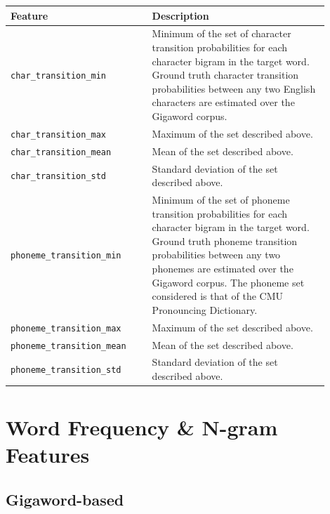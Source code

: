 \documentclass{dcthesis}
\theoremstyle{definition}
\theoremstyle{remark}
\begin{document}
\begin{table}[H]
  \centering
  \begin{tabular}{>{\centering\arraybackslash}p{0.4\linewidth}>{\arraybackslash}p{0.5\linewidth}}
    \hline \textbf{Feature} & \textbf{Description} \\ \hline
    \texttt{char\_transition\_min} & Minimum of the set of character transition probabilities for each character bigram in the target word. Ground truth character transition probabilities between any two English characters are estimated over the Gigaword corpus.\\
    \hline 
    \texttt{char\_transition\_max} & Maximum of the set described above.\\
    \hline 
    \texttt{char\_transition\_mean} & Mean of the set described above.\\
    \hline 
    \texttt{char\_transition\_std} & Standard deviation of the set described above.\\
    \hline 
    \texttt{phoneme\_transition\_min} & Minimum of the set of phoneme transition probabilities for each character bigram in the target word. Ground truth phoneme transition probabilities between any two phonemes are estimated over the Gigaword corpus. The phoneme set considered is that of the CMU Pronouncing Dictionary.\tablefootnote{\url{http://speech.cs.cmu.edu/cgi-bin/cmudict}}\\
    \hline 
    \texttt{phoneme\_transition\_max} & Maximum of the set described above.\\
    \hline 
    \texttt{phoneme\_transition\_mean} & Mean of the set described above.\\
    \hline 
    \texttt{phoneme\_transition\_std} & Standard deviation of the set described above.\\
    \hline
  \end{tabular}
  \label{phonetic_features}
\end{table}

\section{Word Frequency \& N-gram Features}

\subsection{Gigaword-based}
\end{document}
